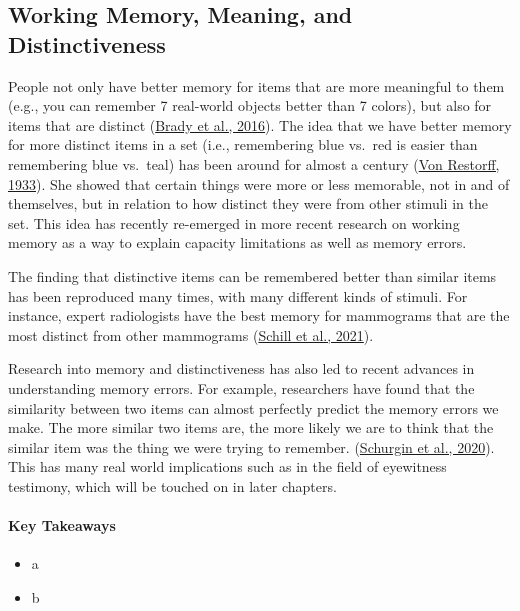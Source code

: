\documentclass[
]{krantz}
\providecommand{\tightlist}{%
  \setlength{\itemsep}{0pt}\setlength{\parskip}{0pt}}
\begin{document}
\hypertarget{working-memory-meaning-and-distinctiveness}{%
\subsection{Working Memory, Meaning, and Distinctiveness}\label{working-memory-meaning-and-distinctiveness}}

People not only have better memory for items that are more meaningful to them (e.g., you can remember 7 real-world objects better than 7 colors), but also for items that are distinct (\protect\hyperlink{ref-Brady2016}{Brady et al., 2016}). The idea that we have better memory for more distinct items in a set (i.e., remembering blue vs.~red is easier than remembering blue vs.~teal) has been around for almost a century (\protect\hyperlink{ref-Von1933}{Von Restorff, 1933}). She showed that certain things were more or less memorable, not in and of themselves, but in relation to how distinct they were from other stimuli in the set. This idea has recently re-emerged in more recent research on working memory as a way to explain capacity limitations as well as memory errors.

The finding that distinctive items can be remembered better than similar items has been reproduced many times, with many different kinds of stimuli. For instance, expert radiologists have the best memory for mammograms that are the most distinct from other mammograms (\protect\hyperlink{ref-Schill2021}{Schill et al., 2021}).

Research into memory and distinctiveness has also led to recent advances in understanding memory errors. For example, researchers have found that the similarity between two items can almost perfectly predict the memory errors we make. The more similar two items are, the more likely we are to think that the similar item was the thing we were trying to remember. (\protect\hyperlink{ref-Schurgin2020}{Schurgin et al., 2020}). This has many real world implications such as in the field of eyewitness testimony, which will be touched on in later chapters.

\hypertarget{key-takeaways-3}{%
\paragraph*{Key Takeaways}\label{key-takeaways-3}}

\begin{itemize}
\tightlist
\item
  a
\item
  b
\end{itemize}
\end{document}
